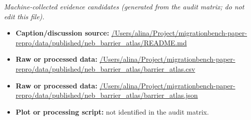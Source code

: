 \emph{Machine-collected evidence candidates (generated from the audit matrix; do not edit this file).}
\begin{itemize}[leftmargin=1.4em,noitemsep]
\item \textbf{Caption/discussion source:} \url{/Users/alina/Project/migrationbench-paper-repro/data/published/neb_barrier_atlas/README.md}
\item \textbf{Raw or processed data:} \url{/Users/alina/Project/migrationbench-paper-repro/data/published/neb_barrier_atlas/barrier_atlas.csv}
\item \textbf{Raw or processed data:} \url{/Users/alina/Project/migrationbench-paper-repro/data/published/neb_barrier_atlas/barrier_atlas.json}
\item \textbf{Plot or processing script:} not identified in the audit matrix.
\end{itemize}
